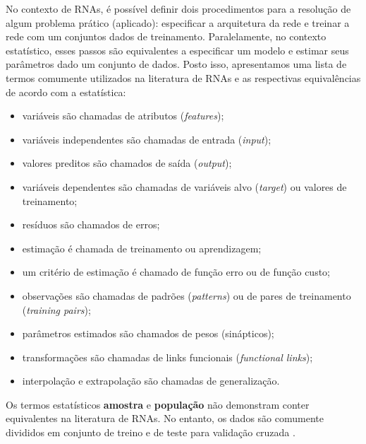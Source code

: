 \documentclass{automatextcc}
\begin{document}
No contexto de RNAs, é possível definir dois procedimentos para a resolução de algum problema prático (aplicado): especificar a arquitetura da rede e treinar a rede com um conjuntos dados de treinamento. Paralelamente, no contexto estatístico, esses passos são equivalentes a especificar um modelo e estimar seus parâmetros dado um conjunto de dados. Posto isso, apresentamos uma lista de termos comumente utilizados na literatura de RNAs e as respectivas equivalências de acordo com a estatística:
\begin{itemize}
    \item variáveis são chamadas de atributos (\textit{features});
    \item variáveis independentes são chamadas de entrada (\textit{input});
    \item valores preditos são chamados de saída (\textit{output});
    \item variáveis dependentes são chamadas de variáveis alvo (\textit{target}) ou valores de treinamento;
    \item resíduos são chamados de erros;
    \item estimação é chamada de treinamento ou aprendizagem;
    \item um critério de estimação é chamado de função erro ou de função custo;
    \item observações são chamadas de padrões (\textit{patterns}) ou de pares de treinamento (\textit{training pairs});
    \item parâmetros estimados são chamados de pesos (sinápticos);
    \item transformações são chamadas de links funcionais (\textit{functional links});
    \item interpolação e extrapolação são chamadas de generalização.
\end{itemize}
Os termos estatísticos \textbf{amostra} e \textbf{população} não demonstram conter equivalentes na literatura de RNAs. No entanto, os dados são comumente divididos em conjunto de treino e de teste para validação cruzada \citep{cheng1994}.



\end{document}
